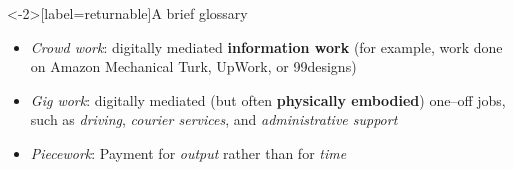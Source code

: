 \documentclass[presentation]{subfiles}
\begin{document}

\begin{frame}<-2>[label=returnable]{A brief glossary}
      \begin{itemize}
        \item<1> \textit{Crowd work}: digitally mediated \textbf{information work}
        (for example, work done on Amazon Mechanical Turk, UpWork, or 99designs)~\cite{crowdworkFuture}
        \item<2> \textit{Gig work}: digitally mediated (but often \textbf{physically embodied}) one--off jobs,
        such as
        \textit{driving},
        \textit{courier services},
        and \textit{administrative support}~\cite{friedman2014workers,Parigi:2016:GE:3026779.3013496}
        \item<3> \textit{Piecework}: Payment for \textit{output} rather than for \textit{time}
      \end{itemize}
\end{frame}
\end{document}

